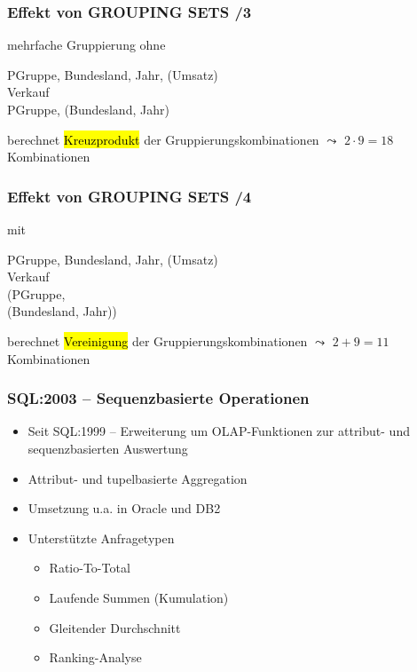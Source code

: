     
    
    
    
    \begin{frame}
    
      \frametitle{Effekt von GROUPING SETS /3}
    
      mehrfache Gruppierung ohne 
    
      \begin{sql}
         PGruppe, Bundesland, Jahr, (Umsatz) \\
         Verkauf \\
         PGruppe, (Bundesland, Jahr)
      \end{sql}
    
      berechnet \hl{Kreuzprodukt} der Gruppierungskombinationen $\leadsto$ $2 \cdot 9 = 18$ Kombinationen
    
    \end{frame}
    
    
    \begin{frame}
    
      \frametitle{Effekt von GROUPING SETS /4}
    
    mit 
    
    \begin{sql}
       PGruppe, Bundesland, Jahr, (Umsatz) \\
       Verkauf \\
      (PGruppe, \\
      \1 (Bundesland, Jahr))
    \end{sql}
    
     berechnet \hl{Vereinigung} der Gruppierungskombinationen $\leadsto$ $2 + 9 = 11$ Kombinationen
    \end{frame}
    
    \begin{frame}
    
    \frametitle{SQL:2003 -- Sequenzbasierte Operationen}
    
    \begin{itemize}
    \item Seit SQL:1999 -- Erweiterung um OLAP-Funktionen zur attribut- und
      sequenzbasierten Auswertung
    \item Attribut- und tupelbasierte Aggregation
    \item Umsetzung u.a. in Oracle und DB2
    \item Unterstützte Anfragetypen
      \begin{itemize}
      \item Ratio-To-Total
      \item Laufende Summen (Kumulation)
      \item Gleitender Durchschnitt
      \item Ranking-Analyse
      \end{itemize}
    \end{itemize}
    
    \end{frame}
    
